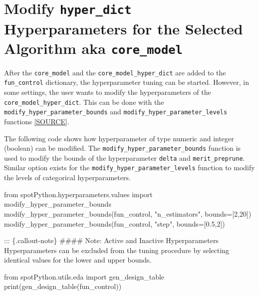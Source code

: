 \documentclass[
  letterpaper,
  DIV=11,
  numbers=noendperiod]{scrreprt}
\newenvironment{Shaded}{\begin{snugshade}}{\end{snugshade}}
\newcommand{\BuiltInTok}[1]{\textcolor[rgb]{0.00,0.23,0.31}{#1}}
\newcommand{\DecValTok}[1]{\textcolor[rgb]{0.68,0.00,0.00}{#1}}
\newcommand{\FloatTok}[1]{\textcolor[rgb]{0.68,0.00,0.00}{#1}}
\newcommand{\ImportTok}[1]{\textcolor[rgb]{0.00,0.46,0.62}{#1}}
\newcommand{\NormalTok}[1]{\textcolor[rgb]{0.00,0.23,0.31}{#1}}
\newcommand{\OperatorTok}[1]{\textcolor[rgb]{0.37,0.37,0.37}{#1}}
\newcommand{\StringTok}[1]{\textcolor[rgb]{0.13,0.47,0.30}{#1}}
\begin{document}
\hypertarget{modify-hyper_dict-hyperparameters-for-the-selected-algorithm-aka-core_model-2}{%
\section{\texorpdfstring{Modify \texttt{hyper\_dict} Hyperparameters for
the Selected Algorithm aka
\texttt{core\_model}}{Modify hyper\_dict Hyperparameters for the Selected Algorithm aka core\_model}}\label{modify-hyper_dict-hyperparameters-for-the-selected-algorithm-aka-core_model-2}}

After the \texttt{core\_model} and the \texttt{core\_model\_hyper\_dict}
are added to the \texttt{fun\_control} dictionary, the hyperparameter
tuning can be started. However, in some settings, the user wants to
modify the hyperparameters of the \texttt{core\_model\_hyper\_dict}.
This can be done with the \texttt{modify\_hyper\_parameter\_bounds} and
\texttt{modify\_hyper\_parameter\_levels} functions
\href{https://github.com/sequential-parameter-optimization/spotPython/blob/main/src/spotPython/hyperparameters/values.py}{{[}SOURCE{]}}.

The following code shows how hyperparameter of type numeric and integer
(boolean) can be modified. The \texttt{modify\_hyper\_parameter\_bounds}
function is used to modify the bounds of the hyperparameter
\texttt{delta} and \texttt{merit\_preprune}. Similar option exists for
the \texttt{modify\_hyper\_parameter\_levels} function to modify the
levels of categorical hyperparameters.

\begin{Shaded}
\begin{Highlighting}[]
\ImportTok{from}\NormalTok{ spotPython.hyperparameters.values }\ImportTok{import}\NormalTok{ modify\_hyper\_parameter\_bounds}
\NormalTok{modify\_hyper\_parameter\_bounds(fun\_control, }\StringTok{"n\_estimators"}\NormalTok{, bounds}\OperatorTok{=}\NormalTok{[}\DecValTok{2}\NormalTok{,}\DecValTok{20}\NormalTok{])}
\NormalTok{modify\_hyper\_parameter\_bounds(fun\_control, }\StringTok{"step"}\NormalTok{, bounds}\OperatorTok{=}\NormalTok{[}\FloatTok{0.5}\NormalTok{,}\DecValTok{2}\NormalTok{])}
\end{Highlighting}
\end{Shaded}

::: \{.callout-note\} \#\#\#\# Note: Active and Inactive Hyperparameters
Hyperparameters can be excluded from the tuning procedure by selecting
identical values for the lower and upper bounds.

\begin{Shaded}
\begin{Highlighting}[]
\ImportTok{from}\NormalTok{ spotPython.utils.eda }\ImportTok{import}\NormalTok{ gen\_design\_table}
\BuiltInTok{print}\NormalTok{(gen\_design\_table(fun\_control))}
\end{Highlighting}
\end{Shaded}
\end{document}
